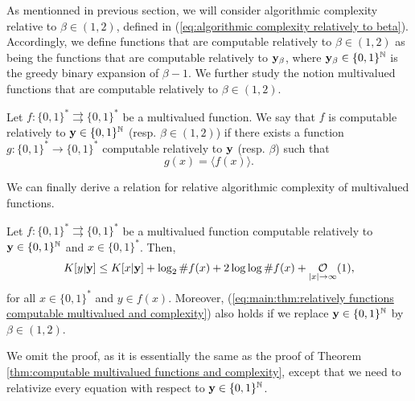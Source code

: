 As mentionned in previous section, we will consider algorithmic complexity relative to $\beta \in (1,2)$, defined in (\ref{eq:algorithmic complexity relatively to beta}). Accordingly, we define functions that are computable relatively to $\beta \in (1,2)$ as being the functions that are computable relatively to ${\bf y}_\beta$, where ${\bf y}_\beta \in \{0,1\}^{\mathbb{N}}$ is the greedy binary expansion of $\beta - 1$. We further study the notion multivalued functions that are computable relatively to $\beta \in (1,2)$.
\begin{definition}\label{def:relatively computable multivalued function}
    Let $f: \{0,1\}^\ast \rightrightarrows \{0,1\}^\ast$ be a multivalued function. We say that $f$ is computable relatively to ${\bf y}\in \{0,1\}^{\mathbb{N}}$ (resp. $\beta \in (1,2)$) if there exists a function $g : \{0,1\}^\ast \to \{0,1\}^\ast$ computable relatively to ${\bf y}$ (resp. $\beta$) such that 
    \begin{equation}
        g(x) = \langle  f(x) \rangle. 
    \end{equation}
\end{definition}
We can finally derive a relation for relative algorithmic complexity of multivalued functions.
\begin{theorem}\label{thm:relatively computable multivalued functions and complexity}
    Let $f: \{0,1\}^\ast \rightrightarrows \{0,1\}^\ast$ be a multivalued function computable relatively to ${\bf y} \in \{0,1\}^{\mathbb{N}}$ and $x \in \{0,1\}^\ast$. Then, 
    \begin{equation}\label{eq:main:thm:relatively functions computable multivalued  and complexity}
        K[y|\yf] \leq K[x|\yf] + \log_2 \#f(x) + 2\log \log \#f(x) + \bigOx[1]{\len x},
    \end{equation}
    for all $x \in \{0,1\}^\ast$ and $y \in f(x)$. Moreover, (\ref{eq:main:thm:relatively functions computable multivalued  and complexity}) also holds if we replace ${\bf y} \in \{0,1\}^{\mathbb{N}}$ by $\beta\in(1,2)$.
\end{theorem}
We omit the proof, as it is essentially the same as the proof of Theorem \ref{thm:computable multivalued functions and complexity}, except that we need to relativize every equation with respect to ${\bf y} \in \{0,1\}^{\mathbb{N}}$.




    
    
